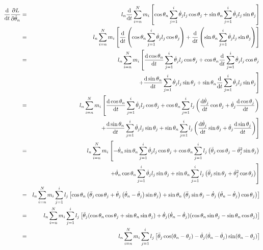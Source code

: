 \documentclass[12pt]{article}
\begin{document}
	\begin{eqnarray*}
	\dv{t}\pdv{L}{\dot{\theta}_n}&=&l_n\dv{t}\sum_{i=n}^N m_i\left[\cos{\theta_n}\sum_{j=1}^i \dot{\theta}_j l_j \cos{\theta_j}+ \sin{\theta_n}\sum_{j=1}^i \dot{\theta}_j l_j \sin{\theta_j}\right]\\
	&=&l_n\sum_{i=n}^N m_i\left[\dv{t}\left(\cos{\theta_n}\sum_{j=1}^i \dot{\theta}_j l_j \cos{\theta_j}\right)+ \dv{t}\left(\sin{\theta_n}\sum_{j=1}^i \dot{\theta}_j l_j \sin{\theta_j}\right)\right]\\
	&=&l_n\sum_{i=n}^N m_i\left[\dv{\cos{\theta_n}}{t}\sum_{j=1}^i \dot{\theta}_j l_j \cos{\theta_j}+\cos{\theta_n}\dv{t}\sum_{j=1}^i \dot{\theta}_j l_j \cos{\theta_j}\right.\\
	&&\qquad\quad\left.+ \dv{\sin{\theta_n}}{t}\sum_{j=1}^i \dot{\theta}_j l_j \sin{\theta_j}+\sin{\theta_n} \dv{t}\sum_{j=1}^i \dot{\theta}_j l_j \sin{\theta_j}\right]\\
	&=&l_n\sum_{i=n}^N m_i\left[\dv{\cos{\theta_n}}{t}\sum_{j=1}^i \dot{\theta}_j l_j \cos{\theta_j}+\cos{\theta_n}\sum_{j=1}^i l_j\left( \dv{\dot{\theta}_j}{t} \cos{\theta_j} + \dot{\theta}_j \dv{\cos{\theta_j}}{t}\right)\right.\\
	&&\qquad\quad\left.+ \dv{\sin{\theta_n}}{t}\sum_{j=1}^i \dot{\theta}_j l_j \sin{\theta_j}+\sin{\theta_n} \sum_{j=1}^i l_j\left( \dv{\dot{\theta}_j}{t} \sin{\theta_j} + \dot{\theta}_j \dv{\sin{\theta_j}}{t} \right)\right]\\
	&=&l_n\sum_{i=n}^N m_i\left[-\dot{\theta}_n\sin{\theta_n}\sum_{j=1}^i \dot{\theta}_j l_j \cos{\theta_j}+\cos{\theta_n}\sum_{j=1}^i l_j\left( \ddot{\theta}_j \cos{\theta_j} - \dot{\theta}_j^2 \sin{\theta_j}\right)\right.\\
	&&\qquad\quad\left.+ \dot{\theta}_n\cos{\theta_n}\sum_{j=1}^i \dot{\theta}_j l_j \sin{\theta_j}+\sin{\theta_n} \sum_{j=1}^i l_j\left( \ddot{\theta}_j \sin{\theta_j} + \dot{\theta}_j^2 \cos{\theta_j} \right)\right]\\
	&=&l_n\sum_{i=n}^N m_i\sum_{j=1}^il_j\left[ \cos{\theta_n}\left( \ddot{\theta}_j\cos{\theta}_j+\dot{\theta}_j\left(\dot{\theta}_n-\dot{\theta}_j\right)\sin{\theta}_j \right) + \sin{\theta_n} \left( \ddot{\theta}_j\sin{\theta}_j - \dot{\theta}_j\left(\dot{\theta}_n-\dot{\theta}_j\right)\cos{\theta}_j \right) \right]\\
	&=&l_n\sum_{i=n}^N m_i\sum_{j=1}^il_j\left[ \ddot{\theta}_j(\cos{\theta_n}\cos{\theta_j}+\sin{\theta_n}\sin{\theta_j})+\dot{\theta}_j(\dot{\theta}_n-\dot{\theta}_j)(\cos{\theta_n}\sin{\theta_j}-\sin{\theta_n}\cos{\theta_j}) \right]\\
	&=&l_n\sum_{i=n}^N m_i\sum_{j=1}^il_j\left[ \ddot{\theta}_j\cos(\theta_n-\theta_j)-\dot{\theta}_j(\dot{\theta}_n-\dot{\theta}_j)\sin(\theta_n-\theta_j) \right]
	\end{eqnarray*}
\end{document}
